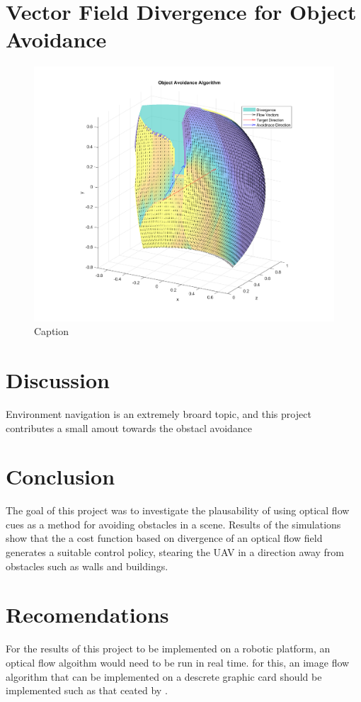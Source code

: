 \documentclass{UoNMCHA}
\numberwithin{equation}{section}
\begin{document}
\section{Vector Field Divergence for Object Avoidance}
\begin{figure}[ht]
    \begin{center}
        \includegraphics[width=.8\linewidth]{Figures/Matlab/Avoidance_Algorithm}
        \caption{Caption}
        \label{fig:Avoidance_Algorithm}
    \end{center}
\end{figure}

\newpage
\section{Discussion}
Environment navigation is an extremely broard topic, and this project contributes a small amout towards the obstacl avoidance 
\newpage
\section{Conclusion}\label{sec:Conclusion}
The goal of this project was to investigate the plausability of using optical flow cues as a method for avoiding obstacles in a scene. Results of the simulations show that the a cost function based on divergence of an optical flow field generates a suitable control policy, stearing the UAV in a direction away from obstacles such as walls and buildings. 

\newpage
\section{Recomendations}
For the results of this project to be implemented on a robotic platform, an optical flow algoithm would need to be run in real time. for this, an image flow algorithm that can be implemented on a descrete graphic card should be implemented such as that ceated by \cite{adarve2016filter}.
\end{document}

